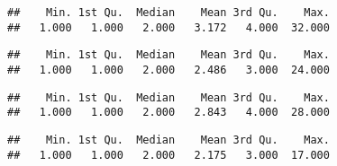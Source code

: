 \documentclass[
]{article}
\newenvironment{Shaded}{\begin{snugshade}}{\end{snugshade}}
\newcommand{\DecValTok}[1]{\textcolor[rgb]{0.00,0.00,0.81}{#1}}
\newcommand{\KeywordTok}[1]{\textcolor[rgb]{0.13,0.29,0.53}{\textbf{#1}}}
\newcommand{\NormalTok}[1]{#1}
\newcommand{\OperatorTok}[1]{\textcolor[rgb]{0.81,0.36,0.00}{\textbf{#1}}}
\newcommand{\StringTok}[1]{\textcolor[rgb]{0.31,0.60,0.02}{#1}}
\begin{document}
\begin{verbatim}
##    Min. 1st Qu.  Median    Mean 3rd Qu.    Max. 
##   1.000   1.000   2.000   3.172   4.000  32.000
\end{verbatim}

\begin{Shaded}
\end{Shaded}

\begin{verbatim}
##    Min. 1st Qu.  Median    Mean 3rd Qu.    Max. 
##   1.000   1.000   2.000   2.486   3.000  24.000
\end{verbatim}

\begin{Shaded}
\end{Shaded}

\begin{verbatim}
##    Min. 1st Qu.  Median    Mean 3rd Qu.    Max. 
##   1.000   1.000   2.000   2.843   4.000  28.000
\end{verbatim}

\begin{Shaded}
\end{Shaded}

\begin{verbatim}
##    Min. 1st Qu.  Median    Mean 3rd Qu.    Max. 
##   1.000   1.000   2.000   2.175   3.000  17.000
\end{verbatim}
\end{document}
